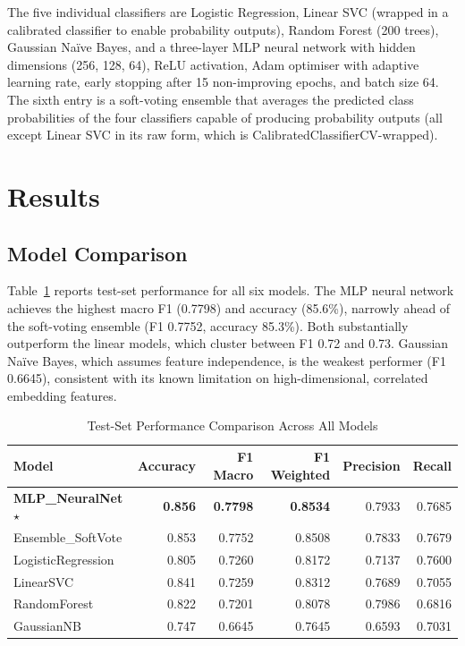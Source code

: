 \documentclass[12pt, a4paper]{article}
\begin{document}
The five individual classifiers are Logistic Regression, Linear SVC (wrapped in a calibrated classifier to enable probability outputs), Random Forest (200 trees), Gaussian Naïve Bayes, and a three-layer MLP neural network with hidden dimensions (256, 128, 64), ReLU activation, Adam optimiser with adaptive learning rate, early stopping after 15 non-improving epochs, and batch size 64. The sixth entry is a soft-voting ensemble that averages the predicted class probabilities of the four classifiers capable of producing probability outputs (all except Linear SVC in its raw form, which is CalibratedClassifierCV-wrapped).

\section{Results}

\subsection{Model Comparison}

Table~\ref{tab:model_comparison} reports test-set performance for all six models. The MLP neural network achieves the highest macro F1 (0.7798) and accuracy (85.6\%), narrowly ahead of the soft-voting ensemble (F1 0.7752, accuracy 85.3\%). Both substantially outperform the linear models, which cluster between F1 0.72 and 0.73. Gaussian Naïve Bayes, which assumes feature independence, is the weakest performer (F1 0.6645), consistent with its known limitation on high-dimensional, correlated embedding features.

\begin{table}[H]
\centering
\caption{Test-Set Performance Comparison Across All Models}
\label{tab:model_comparison}
\begin{tabular}{lrrrrr}
\toprule
\textbf{Model} & \textbf{Accuracy} & \textbf{F1 Macro} & \textbf{F1 Weighted} & \textbf{Precision} & \textbf{Recall} \\
\midrule
\textbf{MLP\_NeuralNet} $\star$ & \textbf{0.856} & \textbf{0.7798} & \textbf{0.8534} & 0.7933 & 0.7685 \\
Ensemble\_SoftVote & 0.853 & 0.7752 & 0.8508 & 0.7833 & 0.7679 \\
LogisticRegression & 0.805 & 0.7260 & 0.8172 & 0.7137 & 0.7600 \\
LinearSVC & 0.841 & 0.7259 & 0.8312 & 0.7689 & 0.7055 \\
RandomForest & 0.822 & 0.7201 & 0.8078 & 0.7986 & 0.6816 \\
GaussianNB & 0.747 & 0.6645 & 0.7645 & 0.6593 & 0.7031 \\
\bottomrule
\end{tabular}
\end{table}
\end{document}
